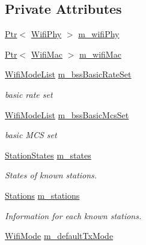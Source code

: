 \subsection*{Private Attributes}
\begin{DoxyCompactItemize}
\item 
\hyperlink{classns3_1_1Ptr}{Ptr}$<$ \hyperlink{classns3_1_1WifiPhy}{Wifi\+Phy} $>$ \hyperlink{classns3_1_1WifiRemoteStationManager_a68cf308f39d3af06d148dae9268b9073}{m\+\_\+wifi\+Phy}
\item 
\hyperlink{classns3_1_1Ptr}{Ptr}$<$ \hyperlink{classns3_1_1WifiMac}{Wifi\+Mac} $>$ \hyperlink{classns3_1_1WifiRemoteStationManager_a8b8b990c8d21c2a5feed00f265f929ca}{m\+\_\+wifi\+Mac}
\item 
\hyperlink{namespacens3_abceecb3f813d2b4af697068f25085024}{Wifi\+Mode\+List} \hyperlink{classns3_1_1WifiRemoteStationManager_acc2500f3f9208b6227adf57bbebb5bd7}{m\+\_\+bss\+Basic\+Rate\+Set}
\begin{DoxyCompactList}\small\item\em basic rate set \end{DoxyCompactList}\item 
\hyperlink{namespacens3_abceecb3f813d2b4af697068f25085024}{Wifi\+Mode\+List} \hyperlink{classns3_1_1WifiRemoteStationManager_a591e8d3c3d9216195a1ef7b513b4ad0c}{m\+\_\+bss\+Basic\+Mcs\+Set}
\begin{DoxyCompactList}\small\item\em basic M\+CS set \end{DoxyCompactList}\item 
\hyperlink{classns3_1_1WifiRemoteStationManager_a22b074985212bd285e2d7a35dbe2a392}{Station\+States} \hyperlink{classns3_1_1WifiRemoteStationManager_aa1b308110d49a43fcad379978fd90cc5}{m\+\_\+states}
\begin{DoxyCompactList}\small\item\em States of known stations. \end{DoxyCompactList}\item 
\hyperlink{classns3_1_1WifiRemoteStationManager_a7b768b3ab57de5bb047d594b8636be40}{Stations} \hyperlink{classns3_1_1WifiRemoteStationManager_abe6711bcc48ef1c5a3f4c9949137080d}{m\+\_\+stations}
\begin{DoxyCompactList}\small\item\em Information for each known stations. \end{DoxyCompactList}\item 
\hyperlink{classns3_1_1WifiMode}{Wifi\+Mode} \hyperlink{classns3_1_1WifiRemoteStationManager_add9d43495614411572af4fa9fe7b50c8}{m\+\_\+default\+Tx\+Mode}

\end{DoxyCompactItemize}
